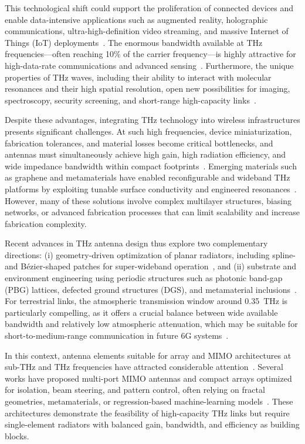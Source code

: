 \documentclass[USenglish]{article}
\begin{document}
This technological shift could support the proliferation of connected devices and enable data-intensive applications such as augmented reality, holographic communications, ultra-high-definition video streaming, and massive Internet of Things (IoT) deployments~\cite{jornet_internet_2012,amin_step_2022}. The enormous bandwidth available at THz frequencies---often reaching 10\% of the carrier frequency---is highly attractive for high-data-rate communications and advanced sensing~\cite{sen_physical_2022}. Furthermore, the unique properties of THz waves, including their ability to interact with molecular resonances and their high spatial resolution, open new possibilities for imaging, spectroscopy, security screening, and short-range high-capacity links~\cite{nissanov_terahertz_2023,krishna_rhombus_2021}.

Despite these advantages, integrating THz technology into wireless infrastructures presents significant challenges. At such high frequencies, device miniaturization, fabrication tolerances, and material losses become critical bottlenecks, and antennas must simultaneously achieve high gain, high radiation efficiency, and wide impedance bandwidth within compact footprints~\cite{ullah_thz_2019}. Emerging materials such as graphene and metamaterials have enabled reconfigurable and wideband THz platforms by exploiting tunable surface conductivity and engineered resonances~\cite{moradi_graphene_2021,krishna_graphene_2023}. However, many of these solutions involve complex multilayer structures, biasing networks, or advanced fabrication processes that can limit scalability and increase fabrication complexity.

Recent advances in THz antenna design thus explore two complementary directions: (i) geometry-driven optimization of planar radiators, including spline- and Bézier-shaped patches for super-wideband operation~\cite{marouf_bezier_2023}, and (ii) substrate and environment engineering using periodic structures such as photonic band-gap (PBG) lattices, defected ground structures (DGS), and metamaterial inclusions~\cite{khezzar_pbg_2021,ullah_thz_2019,temmar_bspo_2019,devapriya_metamaterial_2019}. For terrestrial links, the atmospheric transmission window around 0.35~THz is particularly compelling, as it offers a crucial balance between wide available bandwidth and relatively low atmospheric attenuation, which may be suitable for short-to-medium-range communication in future 6G systems~\cite{strinati_6g_2019,khezzar_pbg_2021}.

In this context, antenna elements suitable for array and MIMO architectures at sub-THz and THz frequencies have attracted considerable attention~\cite{mousa_ebg_2026,li_triband_2024,nirob_grid_2025}. Several works have proposed multi-port MIMO antennas and compact arrays optimized for isolation, beam steering, and pattern control, often relying on fractal geometries, metamaterials, or regression-based machine-learning models~\cite{panda_fractal_2025,devapriya_metamaterial_2019,krishna_rhombus_2021}. These architectures demonstrate the feasibility of high-capacity THz links but require single-element radiators with balanced gain, bandwidth, and efficiency as building blocks.
\end{document}

